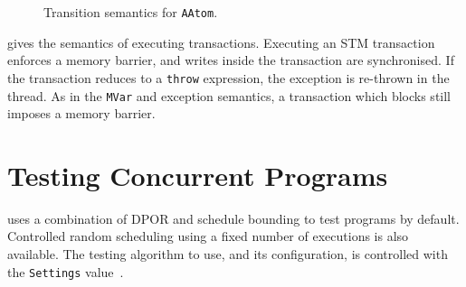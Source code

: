 \begin{figure}[h]
\centering
\begin{prooftree}
\end{prooftree}

\begin{prooftree}
\end{prooftree}

\begin{prooftree}
\end{prooftree}
\caption{Transition semantics for \texttt{AAtom}.}\label{fig:sem_aatom}
\end{figure}

 gives the semantics of executing transactions.
Executing an STM transaction enforces a memory barrier, and writes
inside the transaction are synchronised.  If the transaction reduces
to a \verb|throw| expression, the exception is re-thrown in the
thread.  As in the \verb|MVar| and exception semantics, a transaction
which blocks still imposes a memory barrier.

\FloatBarrier
\section{Testing Concurrent Programs}
\label{sec:dejafu-testing}

\dejafu{} uses a combination of DPOR and schedule bounding to test
programs by default.  Controlled random scheduling using a fixed
number of executions is also available.  The testing algorithm to use,
and its configuration, is controlled with the \verb|Settings|
value~.

